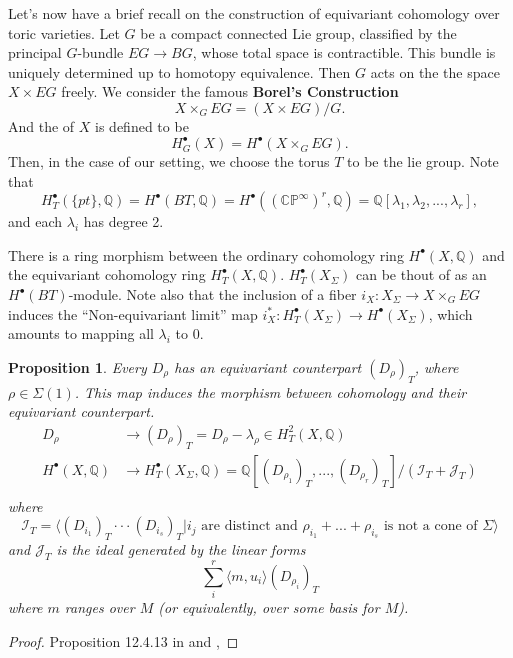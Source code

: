 \documentclass[11pt]{article}
\newtheorem{prop}[thm]{Proposition}
\newcommand{\ratl}{\mathbb Q}
\begin{document}
Let's now have a brief recall on the construction of equivariant cohomology over toric varieties. Let $G$ be a compact connected Lie group, classified by  the principal $G$-bundle $EG\rightarrow BG$, whose total space is contractible. This bundle is uniquely determined up to homotopy equivalence. Then $G$ acts on the the space$X\times EG$ freely. We consider the famous \textbf{Borel's Construction} \cite{borel1960seminar}
\begin{equation}
	X\times_G EG=(X\times EG)/G.
\end{equation}
And the  of $X$ is defined to be 
\begin{equation}
	H^\bullet_{G}(X)=H^\bullet(X\times_G EG).
\end{equation}
Then, in the case of our setting, we choose the torus $T$ to be the lie group. Note that 
$$
H^\bullet_T(\{pt\},\ratl)=H^\bullet(BT,\ratl)=H^\bullet((\mathbb{CP^\infty})^r,\ratl)=\mathbb{Q}[\lambda_1,\lambda_2,...,\lambda_r ],
$$
and each $\lambda_i$ has degree 2.

There is a ring morphism between the ordinary cohomology ring $H^\bullet(X,\mathbb{Q})$ and the equivariant cohomology ring $H_{T}^{\bullet}(X,\mathbb{Q})$. $H^\bullet_T(X_\Sigma)$ can be thout of as an $H^\bullet(BT)$-module. Note also that the inclusion of a fiber $i_{X}: X_\Sigma\rightarrow X\times_G EG$ induces the ``Non-equivariant limit'' map $i^*_X: H^\bullet_T(X_\Sigma)\rightarrow H^\bullet(X_\Sigma)$, which amounts to mapping all $\lambda_i$ to 0.
\begin{prop}
Every $D_\rho$ has an equivariant counterpart $(D_\rho)_T$, where $\rho\in \Sigma(1)$. This map induces the morphism between cohomology and their equivariant counterpart.
\begin{equation*}
\begin{aligned}
D_\rho & \longrightarrow (D_{\rho})_T=D_\rho-\lambda_\rho\in H^2_T(X,\ratl)\\
 H^\bullet (X,\ratl)&\longrightarrow H^\bullet_T(X_\Sigma,\mathbb{Q})=\mathbb{Q}[(D_{\rho_1})_T,...,(D_{\rho_r})_T]/(\mathcal{I}_T+\mathcal{J}_T)\\
\end{aligned}
\end{equation*}
where
\begin{equation*}
\mathcal{I}_T = \langle (D_{i_1})_T\cdot\cdot\cdot (D_{i_s})_T | i_j \text{ are distinct and } \rho_{i_1}+...+\rho_{i_s} \text{ is not a cone of } \Sigma\rangle
\end{equation*}
and $\mathcal{J}_T$ is the ideal generated by the linear forms
\begin{equation*}
\sum_{i}^r\langle m, u_i \rangle (D_{\rho_i})_T
\end{equation*}
where $m$ ranges over $M$ (or equivalently, over some basis for $M$).

\end{prop}
\begin{proof}
Proposition 12.4.13 in \cite{cox2009toric} and \cite{givental1998mirror},
\end{proof}
\end{document}
